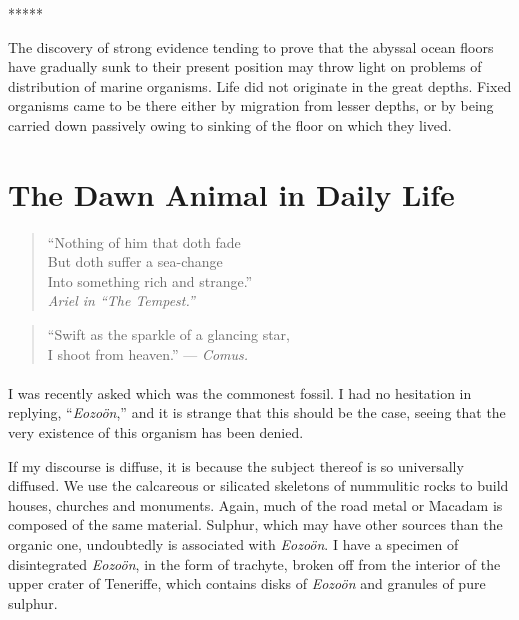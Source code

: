\documentclass[a4paper, 12pt, oneside]{article}
\begin{document}
\centerline{*\hspace{15mm}*\hspace{15mm}*\hspace{15mm}*\hspace{15mm}*}
\bigskip

The discovery of strong evidence tending to prove that the abyssal ocean floors have gradually sunk to their present position may throw light on problems of distribution of marine organisms. Life did not originate in the great depths. Fixed organisms came to be there either by migration from lesser depths, or by being carried down passively owing to sinking of the floor on which they lived.
\clearpage
\section{The Dawn Animal in Daily Life}
\begin{quote}
``Nothing of him that doth fade\\
\hspace*{5mm}But doth suffer a sea-change\\
\hspace*{5mm}Into something rich and strange.''\\
\hspace*{25mm}\emph{Ariel in ``The Tempest.''}
\end{quote}

\begin{quote}
``Swift as the sparkle of a glancing star,\\
\hspace*{5mm}I shoot from heaven.'' --- \emph{Comus.}
\end{quote}
\paragraph{}
I was recently asked which was the commonest fossil. I had no hesitation in replying, ``\emph{Eozoön},'' and it is strange that this should be the case, seeing that the very existence of this organism has been denied.

If my discourse is diffuse, it is because the subject thereof is so universally diffused. We use the calcareous or silicated skeletons of nummulitic rocks to build houses, churches and monuments. Again, much of the road metal or Macadam is composed of the same material. Sulphur, which may have other sources than the organic one, undoubtedly is associated with \emph{Eozoön}. I have a specimen of disintegrated \emph{Eozoön}, in the form of trachyte, broken off from the interior of the upper crater of Teneriffe, which contains disks of \emph{Eozoön} and granules of pure sulphur.
\end{document}
